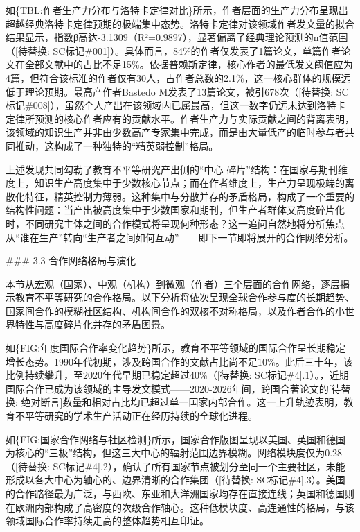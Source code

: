 \documentclass[12pt,a4paper]{article}
\begin{document}
如\{TBL:作者生产力分布与洛特卡定律对比\}所示，作者层面的生产力分布呈现出超越经典洛特卡定律预期的极端集中态势。洛特卡定律对该领域作者发文量的拟合结果显示，指数β高达-3.1309（R²=0.9897），显著偏离了经典理论预测的n值范围（[待替换: SC标记\#001]）。具体而言，84\%的作者仅发表了1篇论文，单篇作者论文在全部文献中的占比不足15\%。依据普赖斯定律，核心作者的最低发文阈值应为4篇，但符合该标准的作者仅有30人，占作者总数的2.1\%，这一核心群体的规模远低于理论预期。最高产作者Bastedo M发表了13篇论文，被引678次（[待替换: SC标记\#008]），虽然个人产出在该领域内已属最高，但这一数字仍远未达到洛特卡定律所预测的核心作者应有的贡献水平。作者生产力与实际贡献之间的背离表明，该领域的知识生产并非由少数高产专家集中完成，而是由大量低产的临时参与者共同推动，这构成了一种独特的“精英弱控制”格局。

上述发现共同勾勒了教育不平等研究产出侧的“中心-碎片”结构：在国家与期刊维度上，知识生产高度集中于少数核心节点；而在作者维度上，生产力呈现极端的离散化特征，精英控制力薄弱。这种集中与分散并存的矛盾格局，构成了一个重要的结构性问题：当产出被高度集中于少数国家和期刊，但生产者群体又高度碎片化时，不同研究主体之间的合作模式将呈现何种形态？这一追问自然地将分析焦点从“谁在生产”转向“生产者之间如何互动”——即下一节即将展开的合作网络分析。

\#\#\# 3.3 合作网络格局与演化

本节从宏观（国家）、中观（机构）到微观（作者）三个层面的合作网络，逐层揭示教育不平等研究的合作格局。以下分析将依次呈现全球合作参与度的长期趋势、国家间合作的模糊社区结构、机构间合作的双核不对称格局，以及作者合作的小世界特性与高度碎片化并存的矛盾图景。

如\{FIG:年度国际合作率变化趋势\}所示，教育不平等领域的国际合作呈长期稳定增长态势。1990年代初期，涉及跨国合作的文献占比尚不足10\%。此后三十年，该比例持续攀升，至2020年代早期已稳定超过40\%（[待替换: SC标记\#4].1）。，近期国际合作已成为该领域的主导发文模式——2020-2026年间，跨国合著论文的[待替换: 绝对断言]数量和相对占比均已超过单一国家内部合作。这一上升轨迹表明，教育不平等研究的学术生产活动正在经历持续的全球化进程。

如\{FIG:国家合作网络与社区检测\}所示，国家合作版图呈现以美国、英国和德国为核心的“三极”结构，但这三大中心的辐射范围边界模糊。网络模块度仅为0.28（[待替换: SC标记\#4].2），确认了所有国家节点被划分至同一个主要社区，未能形成以各大中心为轴心的、边界清晰的合作集团（[待替换: SC标记\#4].3）。美国的合作路径最为广泛，与西欧、东亚和大洋洲国家均存在直接连线；英国和德国则在欧洲内部构成了高密度的次级合作轴心。这种低模块度、高连通性的格局，与该领域国际合作率持续走高的整体趋势相互印证。
\end{document}
